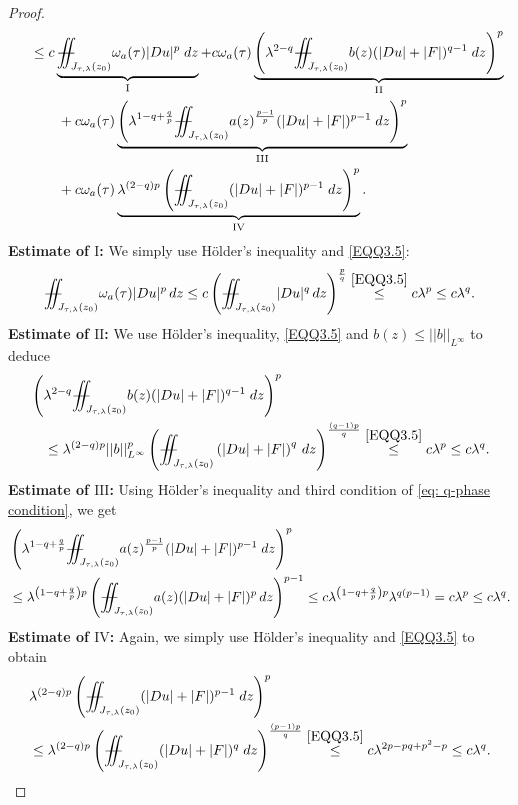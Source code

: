 \documentclass[11pt,oneside, english,reqno,twoside a4paper]{amsart}
\theoremstyle{definition}
\numberwithin{theorem}{section}
\numberwithin{equation}{section}
\newcommand{\iintss}{{\int\hspace{-0.28cm}\int}}
\newcommand{ \miints }{{\iintss\hspace{-0.56cm} -\hspace{-0.15cm}-}}
\newcommand{\miint}[1]{{\miints_{\hspace{-0.13cm}#1}}}
\begin{document}
\begin{proof}
\begin{align}
        &\quad \leq c\underbrace{\miint{J_{\tau,\lambda}(z_0)} \omega_a(\tau)|Du|^{p} \; dz}_{\mathrm{I}} + c\omega_a(\tau)\underbrace{\left(\lambda^{2-q}\miint{J_{\tau,\lambda}(z_0)}b(z) (|Du|+|F|)^{q-1}\;dz \right)^{p}}_{\mathrm{II}}\nonumber\\
        &\quad\qquad + c\omega_a(\tau)\underbrace{\left(\lambda^{1-q+\frac{q}{p}}\miint{J_{\tau,\lambda}(z_0)} a(z)^{\frac{p-1}{p}}(|Du|+|F|)^{p-1}\; dz \right)^{p}}_{\mathrm{III}}\nonumber\\
        &\quad\qquad + c\omega_a(\tau)\underbrace{\lambda^{(2-q) p}\left(\miint{J_{\tau,\lambda}(z_0)} (|Du|+|F|)^{p-1}\; dz \right)^{p}}_{\mathrm{IV}}\nonumber.
    \end{align} 
\textbf{Estimate of $\mathrm{I}$:} We simply use H\"{o}lder's inequality and \eqref{EQQ3.5}:
\begin{align*}
\miint{J_{\tau, \lambda}(z_0)}\omega_{a}(\tau)|Du|^p\,dz\leq c \left(\miint{J_{\tau, \lambda}(z_0)}|Du|^q\,dz\right)^{\frac{p}{q}}\overset{\eqref{EQQ3.5}}{\leq} c\lambda^p \leq c\lambda^q.
\end{align*}
\textbf{Estimate of $\mathrm{II}$:} We use H\"{o}lder's inequality, \eqref{EQQ3.5} and $b(z)\leq ||b||_{L^{\infty}}$ to deduce
\begin{align*}
 &\left(\lambda^{2-q}\miint{J_{\tau,\lambda}(z_0)}b(z) (|Du|+|F|)^{q-1}\;dz \right)^{p}\\
 &\quad \leq  \lambda^{(2-q)p}||b||_{L^{\infty}}^p\left(\miint{J_{\tau, \lambda}(z_0)}\left(|Du|+|F|\right)^{q}\,dz\right)^{\frac{(q-1)p}{q}} \overset{\eqref{EQQ3.5}}{\leq} c\lambda^p\leq c\lambda^q.
\end{align*}
\textbf{Estimate of $\mathrm{III}$:} Using H\"{o}lder's inequality and third condition of \eqref{eq: q-phase condition}, we get
\begin{align*}
&\left(\lambda^{1-q+\frac{q}{p}}\miint{J_{\tau,\lambda}(z_0)} a(z)^{\frac{p-1}{p}}(|Du|+|F|)^{p-1}\; dz \right)^{p}\\
&\leq \lambda^{\left(1-q+\frac{q}{p}\right)p}\left(\miint{J_{\tau, \lambda}(z_0)}a(z)(|Du|+|F|)^{ p}\,dz\right)^{p-1} \leq c\lambda^{\left(1-q+\frac{q}{p}\right)p}\lambda^{q(p-1)}=c\lambda^p\leq c\lambda^q.
\end{align*}
\textbf{Estimate of $\mathrm{IV}$:} Again, we simply use H\"{o}lder's inequality and \eqref{EQQ3.5} to obtain
\begin{align*}
    &\lambda^{(2-q) p}\left(\miint{J_{\tau,\lambda}(z_0)} (|Du|+|F|)^{p-1}\; dz \right)^{ p}\\
    &\leq \lambda^{(2-q)p}\left(\miint{J_{\tau,\lambda}(z_0)} (|Du|+|F|)^{q}\; dz\right)^{\frac{(p-1)p}{q}}\overset{\eqref{EQQ3.5}}{\leq} c\lambda^{2p-pq+p^2-p}\leq c\lambda^{q}.

\end{align*}
\end{proof}
\end{document}
